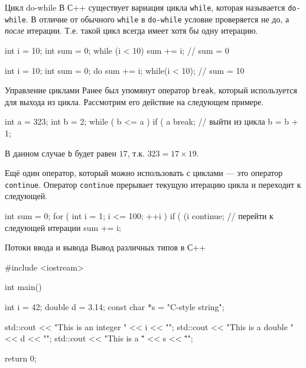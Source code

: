 \documentclass[9pt]{beamer}
\begin{document}
\begin{frame}[fragile]{Цикл do-while}
    В С++ существует вариация цикла \texttt{while}, которая называется \texttt{do-while}. В отличие от обычного \texttt{while} в \texttt{do-while} условие проверяется не до, а \emph{после} итерации. Т.е. такой цикл всегда имеет хотя бы одну итерацию.
    
    \begin{cppcode}
        int i = 10;
        int sum = 0;
        while (i < 10) {
            sum += i;
        }
        // sum = 0
    \end{cppcode}
    
    \vspace{1em}
    \begin{cppcode}
        int i = 10;
        int sum = 0;
        do {
            sum += i;
        } while(i < 10);
        // sum = 10
    \end{cppcode}
\end{frame}

\begin{frame}[fragile]{Управление циклами}
    Ранее был упомянут оператор \texttt{break}, который используется для выхода из цикла. Рассмотрим его действие на следующем примере.
    \begin{cppcode}
        int a = 323;
        int b = 2;
        while ( b <= a ) { 
            if ( a %
            break; // выйти из цикла
            b = b + 1;
        }
    \end{cppcode}
    
    В данном случае \texttt{b} будет равен $ 17 $, т.к. $ 323 = 17 \times 19 $.
    
    \vspace{1em}
    Ещё один оператор, который можно использовать с циклами — это оператор \texttt{continue}. Оператор \texttt{continue} прерывает текущую итерацию цикла и переходит к следующей.
    \begin{cppcode}
        int sum = 0;
        for ( int i = 1; i <= 100; ++i ) {
            if ( (i %
            continue; // перейти к следующей итерации
            sum += i;
        }
    \end{cppcode}
\end{frame}

\begin{frame}[fragile]{Потоки ввода и вывода}
        Вывод различных типов в С++
        \begin{cppcode}
            #include <iostream>
            
            int main()
            {
                int i = 42;
                double d = 3.14;
                const char *s = "C-style string";
                
                std::cout << "This is an integer " << i << "\n";
                std::cout << "This is a double " << d << "\n";
                std::cout << "This is a \"" << s << "\"\n";
                
                return 0;
            }
        \end{cppcode}
    
\end{frame}
\end{document}
